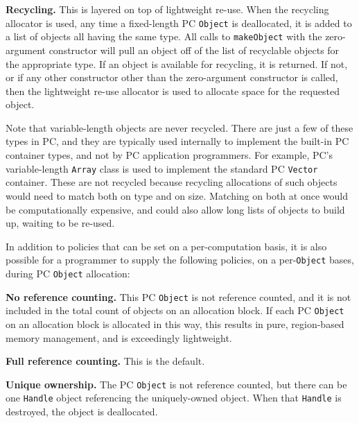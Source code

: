 \textbf{Recycling.}  This is layered on top of lightweight re-use.  When the recycling allocator is used, any time a fixed-length
PC \texttt{Object} is deallocated, it is
added to a list of objects all having the same type.  All calls to \texttt{makeObject} with the zero-argument constructor will
pull an object off of the list of recyclable objects for the appropriate type.  
If an object is available for recycling, it is returned.  If not, or if any other constructor other than the zero-argument constructor is called, 
then the lightweight re-use allocator is used to allocate space for the requested
object.

\vspace{5pt}

Note that
variable-length objects are never recycled.  There are just a few of these types in PC, and they are typically
used internally to implement the built-in PC container
types, and not by PC application programmers.  For example, PC's variable-length
\texttt{Array} class is used to implement the standard PC \texttt{Vector} container.  
These are not recycled because recycling allocations of such objects would need to match both on type and on size.  Matching on both at once would 
be computationally expensive, and could also allow long lists of objects to build up, waiting to be re-used.

In addition to policies that can be set on a per-computation basis,
it is also possible for a programmer to supply the following policies, on a per-\texttt{Object} bases, during PC \texttt{Object} allocation:

\vspace{5pt}

\textbf{No reference counting.}  This PC \texttt{Object} is not reference counted, and it is not included in the total count of objects on an allocation
block.  If each PC \texttt{Object} on an allocation block
is allocated in this way, this results in pure, region-based memory management, and is exceedingly lightweight.

\textbf{Full reference counting.}  This is the default.

\textbf{Unique ownership.}  The PC \texttt{Object} is not reference counted, but there can be one \texttt{Handle} object referencing the uniquely-owned
object.  When that \texttt{Handle} is destroyed, the object is deallocated.

\vspace{5pt}


